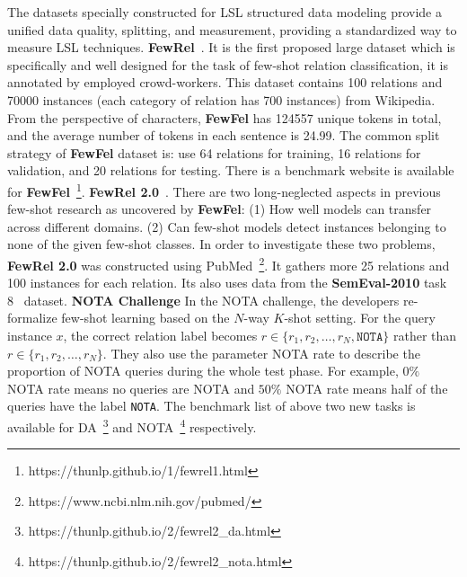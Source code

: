\label{sec5.2}
The datasets specially constructed for LSL structured data modeling provide a unified data quality, splitting, and measurement, providing a standardized way to measure LSL techniques.
\textbf{FewRel}~. It is the first proposed large dataset which is specifically and well designed for the task of few-shot relation classification, it is annotated by employed crowd-workers. This dataset contains 100 relations and 70000 instances (each category of relation has 700 instances) from Wikipedia. From the perspective of characters, \textbf{FewFel} has 124557 unique tokens in total, and the average number of tokens in each sentence is 24.99. The common split strategy of \textbf{FewFel} dataset is: use 64 relations for training, 16 relations for validation, and 20 relations for testing. There is a benchmark website is available for \textbf{FewFel}~\footnote{https://thunlp.github.io/1/fewrel1.html}.
\textbf{FewRel 2.0}~. There are two long-neglected aspects in previous few-shot research as uncovered by \textbf{FewFel}: (1) How well models can transfer across different domains. (2) Can few-shot models detect instances belonging to none of the given few-shot classes. In order to investigate these two problems, \textbf{FewRel 2.0} was constructed using  PubMed~\footnote{https://www.ncbi.nlm.nih.gov/pubmed/}. It gathers more 25 relations and 100 instances for each relation. Its also uses data from the  \textbf{SemEval-2010} task 8~ dataset.
\textbf{NOTA Challenge} In the NOTA challenge, the developers re-formalize few-shot learning based on the $N$-way $K$-shot setting. For the query instance $x$, the correct relation label becomes $r \in \{r_1, r_2,\dots, r_N , \texttt{NOTA} \}$ rather than $r \in \{ r_1, r_2,\dots, r_N \}$. They also use the parameter NOTA rate to describe the proportion of NOTA queries during the whole test phase. For example, $0\%$ NOTA rate means no queries are NOTA and $50\%$ NOTA rate means half of the queries have the label \texttt{NOTA}. The benchmark list of above two new tasks is available for DA~\footnote{https://thunlp.github.io/2/fewrel2\_da.html} and NOTA~\footnote{https://thunlp.github.io/2/fewrel2\_nota.html} respectively.
